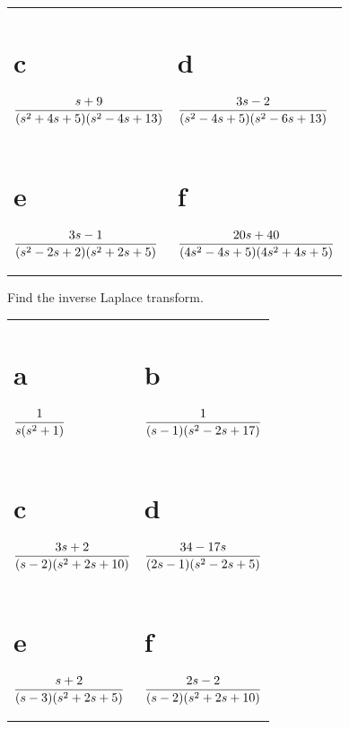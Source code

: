\begin{exerciselist}
\begin{tabular}[t]{@{}p{168pt}@{}p{168pt}}
    \part{c} $\displaystyle\frac{s+9}{(s^{2}+4s+5)(s^{2}-4s+13)}$    & \part{d} $\displaystyle\frac{3s-2}{(s^{2}-4s+5)(s^{2}-6s+13)}$    \\[10pt]
    \part{e} $\displaystyle\frac{3s-1}{(s^{2}-2s+2)(s^{2}+2s+5)}$    & \part{f} $\displaystyle\frac{20s+40}{(4s^{2}-4s+5)(4s^{2}+4s+5)}$
  \end{tabular}

  \item\label{exer:8.2.7} Find the inverse Laplace transform.

  \begin{tabular}[t]{@{}p{168pt}@{}p{168pt}}
    \part{a} $\displaystyle\frac{1}{s(s^{2}+1)}$            & \part{b} $\displaystyle\frac{1}{(s-1)(s^{2}-2s+17)}$      \\[10pt]
    \part{c} $\displaystyle\frac{3s+2}{(s-2)(s^{2}+2s+10)}$ & \part{d} $\displaystyle\frac{34-17s}{(2s-1)(s^{2}-2s+5)}$ \\[10pt]
    \part{e} $\displaystyle\frac{s+2}{(s-3)(s^{2}+2s+5)}$   & \part{f} $\displaystyle\frac{2s-2}{(s-2)(s^{2}+2s+10)}$
  \end{tabular}


\end{exerciselist}
